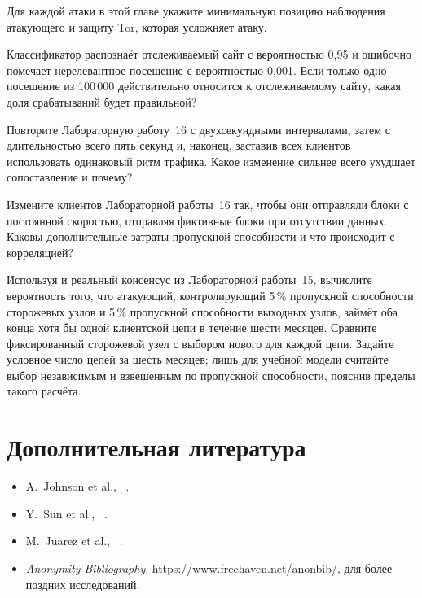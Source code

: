 \begin{esercizio}[1]\label{es:26-posizione}
Для каждой атаки в этой главе укажите минимальную позицию наблюдения атакующего и защиту Tor, которая усложняет атаку.
\end{esercizio}

\begin{esercizio}[1]\label{es:26-base}
Классификатор распознаёт отслеживаемый сайт с вероятностью 0,95 и ошибочно помечает нерелевантное посещение с вероятностью 0,001. Если только одно посещение из 100\,000 действительно относится к отслеживаемому сайту, какая доля срабатываний будет правильной?
\end{esercizio}

\begin{esercizio}[2]\label{es:26-bin}
Повторите Лабораторную работу~16 с двухсекундными интервалами, затем с длительностью всего пять секунд и, наконец, заставив всех клиентов использовать одинаковый ритм трафика. Какое изменение сильнее всего ухудшает сопоставление и почему?
\end{esercizio}

\begin{esercizio}[2]\label{es:26-difesa}
Измените клиентов Лабораторной работы~16 так, чтобы они отправляли блоки с постоянной скоростью, отправляя фиктивные блоки при отсутствии данных. Каковы дополнительные затраты пропускной способности и что происходит с корреляцией?
\end{esercizio}

\begin{esercizio}[3]\label{es:26-probabilita}
Используя  и реальный консенсус из Лабораторной работы~15, вычислите вероятность того, что атакующий, контролирующий 5\,\% пропускной способности сторожевых узлов и 5\,\% пропускной способности выходных узлов, займёт оба конца хотя бы одной клиентской цепи в течение шести месяцев. Сравните фиксированный сторожевой узел с выбором нового для каждой цепи. Задайте условное число цепей за шесть месяцев; лишь для учебной модели считайте выбор независимым и взвешенным по пропускной способности, пояснив пределы такого расчёта.
\end{esercizio}

\section*{Дополнительная литература}
\begin{itemize}
  \item A.~Johnson et al., ~\cite{johnson2013users}.
  \item Y.~Sun et al., ~\cite{sun2015raptor}.
  \item M.~Juarez et al., ~\cite{juarez2014critical}.
  \item \emph{Anonymity Bibliography}, \url{https://www.freehaven.net/anonbib/}, для более поздних исследований.
\end{itemize}
